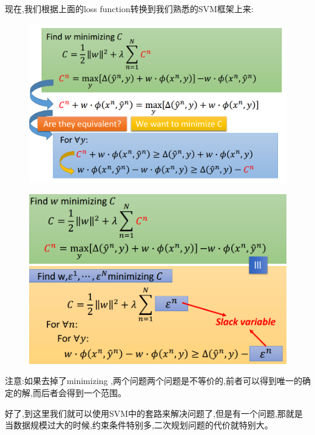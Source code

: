 \documentclass[UTF8,a4paper]{ctexart}
\begin{document}
        现在,我们根据上面的loss function转换到我们熟悉的SVM框架上来:
        \begin{figure}[H]
            \centering
            \includegraphics[scale = 0.3]{assets/ML_50d88.png}
        \end{figure}

        \begin{figure}[H]
            \centering
            \includegraphics[scale = 0.3]{assets/ML_e6bcb.png}
        \end{figure}

        注意:如果去掉了minimizing ,两个问题两个问题是不等价的,前者可以得到唯一的确定的解,而后者会得到一个范围。

        好了,到这里我们就可以使用SVM中的套路来解决问题了,但是有一个问题,那就是当数据规模过大的时候,约束条件特别多,二次规划问题的代价就特别大。
\end{document}
